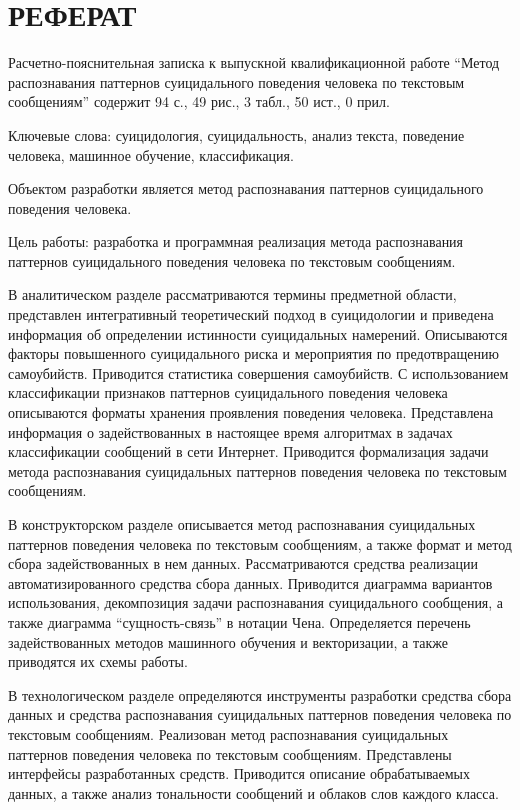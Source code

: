 \section*{РЕФЕРАТ}

Расчетно-пояснительная записка к выпускной квалификационной работе ``Метод распознавания паттернов суицидального поведения человека по текстовым сообщениям'' содержит 94 с., 49 рис., 3 табл., 50 ист., 0 прил.

Ключевые слова: суицидология, суицидальность, анализ текста, поведение человека, машинное обучение, классификация.

Объектом разработки является метод распознавания паттернов суицидального поведения человека.

Цель работы: разработка и программная реализация метода распознавания паттернов суицидального поведения человека по текстовым сообщениям.

В аналитическом разделе рассматриваются термины предметной области, представлен интегративный теоретический подход в суицидологии и приведена информация об определении истинности суицидальных намерений. 
Описываются факторы повышенного суицидального риска и мероприятия по предотвращению самоубийств. 
Приводится статистика совершения самоубийств.
С использованием классификации признаков паттернов суицидального поведения человека описываются форматы хранения проявления поведения человека.
Представлена информация о задействованных в настоящее время алгоритмах в задачах классификации сообщений в сети Интернет.
Приводится формализация задачи метода распознавания суицидальных паттернов поведения человека по текстовым сообщениям.

В конструкторском разделе описывается метод распознавания суицидальных паттернов поведения человека по текстовым сообщениям, а также формат и метод сбора задействованных в нем данных.
Рассматриваются средства реализации автоматизированного средства сбора данных.
Приводится диаграмма вариантов использования, декомпозиция задачи распознавания суицидального сообщения, а также диаграмма ``сущность-связь'' в нотации Чена.
Определяется перечень задействованных методов машинного обучения и векторизации, а также приводятся их схемы работы.

В технологическом разделе определяются инструменты разработки средства сбора данных и средства распознавания суицидальных паттернов поведения человека по текстовым сообщениям.
Реализован метод распознавания суицидальных паттернов поведения человека по текстовым сообщениям. 
Представлены интерфейсы разработанных средств. 
Приводится описание обрабатываемых данных, а также анализ тональности сообщений и облаков слов каждого класса.

